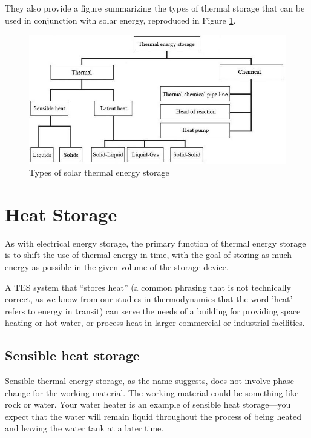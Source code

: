 \documentclass[10pt]{article}
\begin{document}
They also provide a figure summarizing the types of thermal storage that can be used in conjunction with solar energy, reproduced in Figure \ref{types}.

\begin{figure}[h]
\centering
\includegraphics[width=5.5in]{extras32/types.jpg}
\caption{Types of solar thermal energy storage \cite{Sarbu2018-yg}}
\label{types}
\end{figure}


\section{Heat Storage}

As with electrical energy storage, the primary function of thermal energy storage is to shift the use of thermal energy in time, with the goal of storing as much energy as possible in the given volume of the storage device.

A TES system that ``stores heat'' (a common phrasing that is not technically correct, as we know from our studies in thermodynamics that the word 'heat' refers to energy in transit) can serve the needs of a building for providing space heating or hot water, or process heat in larger commercial or industrial facilities. 



\subsection{Sensible heat storage}

Sensible thermal energy storage, as the name suggests, does not involve phase change for the working material. The working material could be something like rock or water. Your water heater is an example of sensible heat storage---you expect that the water will remain liquid throughout the process of being heated and leaving the water tank at a later time.
\end{document}
